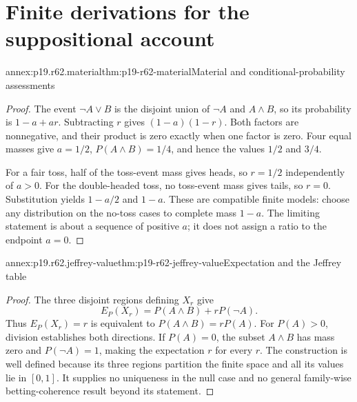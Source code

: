 \section{Finite derivations for the suppositional account}
\label{sec:annex-p19-rationality-6-2}

\begin{annexitem}{annex:p19.r62.material}{thm:p19-r62-material}{Material and conditional-probability assessments}
\begin{proof}
The event \(\neg A\lor B\) is the disjoint union of \(\neg A\)
and \(A\land B\), so its probability is \(1-a+ar\).
Subtracting \(r\) gives \((1-a)(1-r)\). Both factors are
nonnegative, and their product is zero exactly when one factor is zero.
Four equal masses give \(a=1/2\), \(P(A\land B)=1/4\),
and hence the values \(1/2\) and \(3/4\).

For a fair toss, half of the toss-event mass gives heads, so \(r=1/2\)
independently of \(a>0\). For the double-headed toss, no toss-event mass
gives tails, so \(r=0\). Substitution yields \(1-a/2\) and
\(1-a\). These are compatible finite models: choose any distribution
on the no-toss cases to complete mass \(1-a\). The limiting statement
is about a sequence of positive \(a\); it does not assign a ratio to
the endpoint \(a=0\).
\end{proof}
\end{annexitem}

\begin{annexitem}{annex:p19.r62.jeffrey-value}{thm:p19-r62-jeffrey-value}{Expectation and the Jeffrey table}
\begin{proof}
The three disjoint regions defining \(X_r\) give
\[
 E_P(X_r)=P(A\land B)+rP(\neg A).
\]
Thus \(E_P(X_r)=r\) is equivalent to
\(P(A\land B)=rP(A)\). For \(P(A)>0\), division establishes
both directions. If \(P(A)=0\), the subset \(A\land B\) has
mass zero and \(P(\neg A)=1\), making the expectation \(r\)
for every \(r\). The construction is well defined because its
three regions partition the finite space and all its values lie in
\([0,1]\). It supplies no uniqueness in the null case and no
general family-wise betting-coherence result beyond its statement.
\end{proof}
\end{annexitem}

